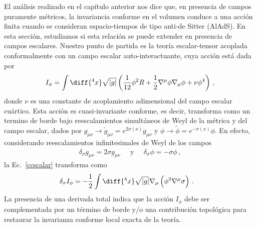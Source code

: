 \documentclass[../Main.tex]{subfiles}
\begin{document}
El análisis realizado en el capítulo anterior nos dice que, en presencia de campos puramente métricos, la invariancia conforme en el volumen conduce a una acción finita cuando se consideran espacio-tiempos de tipo anti-de Sitter (AlAdS). En esta sección, estudiamos si esta relación se puede extender en presencia de campos escalares. Nuestro punto de partida es la teoría escalar-tensor acoplada conformalmente con un campo escalar auto-interactuante, cuya acción está dada por
\begin{equation}\label{ccscalar}
I_\phi = \int\diff{^4x}\sqrt{|g|}\left(\frac{1}{12}\phi^{2} R + \frac{1}{2}\nabla^{\mu} \phi \nabla_{\mu} \phi + \nu\phi^{4}\right) \,,
\end{equation}
donde $\nu$ es una constante de acoplamiento adimensional del campo escalar cuártico. Esta acción es cuasi-invariante conforme, es decir, transforma como un termino de borde bajo reescalamientos simultáneos de Weyl de la métrica y del campo escalar, dados por $g_{\mu\nu}\to\tilde{g}_{\mu\nu} = e^{2\sigma(x)}g_{\mu\nu}$ y $\phi\to\tilde{\phi} = e^{-\sigma(x)}\phi$.
En efecto, considerando reescalamientos infinitesimales de Weyl de los campos 
\begin{align}
\delta_{\sigma} g_{\mu \nu} = 2 \sigma g_{\mu \nu} \;\;\;\;\; \mbox{y} \;\;\;\;\; \delta_{\sigma} \phi = - \sigma \phi \,, 
\end{align}
la Ec.~\eqref{ccscalar} transforma como 
\begin{align}
\delta_{\sigma}I_{\phi} %
&=-\frac{1}{2}\int\diff{^4x}\sqrt{|g|} \nabla_{\mu} \left(\phi^{2} \nabla^{\mu} \sigma \right) \,. \label{Weylvargandphi}
\end{align}
La presencia de una derivada total indica que la acción $I_{\phi}$ debe ser complementada por un término de borde y/o una contribución topológica para restaurar la invarianza conforme local exacta de la teoría.
\end{document}
